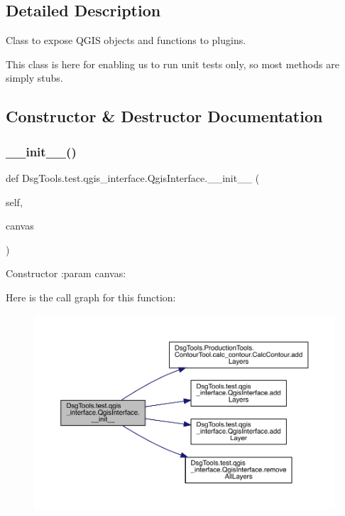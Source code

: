 \subsection{Detailed Description}
\begin{DoxyVerb}Class to expose QGIS objects and functions to plugins.

This class is here for enabling us to run unit tests only,
so most methods are simply stubs.
\end{DoxyVerb}
 

\subsection{Constructor \& Destructor Documentation}
\mbox{\label{class_dsg_tools_1_1test_1_1qgis__interface_1_1_qgis_interface_a1cf8dd282a40571c5788ac6351ce3b47}} 
\subsubsection{\texorpdfstring{\+\_\+\+\_\+init\+\_\+\+\_\+()}{\_\_init\_\_()}}
{\footnotesize\ttfamily def Dsg\+Tools.\+test.\+qgis\+\_\+interface.\+Qgis\+Interface.\+\_\+\+\_\+init\+\_\+\+\_\+ (\begin{DoxyParamCaption}\item[{}]{self,  }\item[{}]{canvas }\end{DoxyParamCaption})}

\begin{DoxyVerb}Constructor
:param canvas:
\end{DoxyVerb}
 Here is the call graph for this function\+:
\nopagebreak
\begin{figure}[H]
\begin{center}
\leavevmode
\includegraphics[width=350pt]{class_dsg_tools_1_1test_1_1qgis__interface_1_1_qgis_interface_a1cf8dd282a40571c5788ac6351ce3b47_cgraph}
\end{center}
\end{figure}



